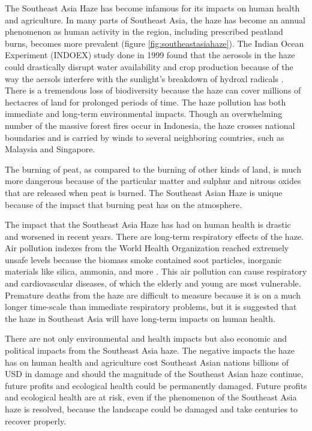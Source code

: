 The Southeast Asia Haze has become infamous for its impacts on human health and agriculture. In many parts of Southeast Asia, the haze has become an annual phenomenon as human activity in the region, including prescribed peatland burns, becomes more prevalent (figure \ref{fig:southeastasiahaze}). The Indian Ocean Experiment (INDOEX) study done in 1999 found that the aerosols in the haze could drastically disrupt water availability and crop production because of the way the aersols interfere with the sunlight's breakdown of hydroxl radicals \citep{taylor2003abcs}. There is a tremendous loss of biodiversity because the haze can cover millions of hectacres of land for prolonged periods of time. The haze pollution has both immediate and long-term environmental impacts. Though an overwhelming number of the massive forest fires occur in Indonesia, the haze crosses national boundaries and is carried by winds to several neighboring countries, such as Malaysia and Singapore.    

The burning of peat, as compared to the burning of other kinds of land, is much more dangerous because of the particular matter and sulphur and nitrous oxides that are released when peat is burned. The Southeast Asian Haze is unique because of the impact that burning peat has on the atmosphere. 

The impact that the Southeast Asia Haze has had on human health is drastic and worsened in recent years. There are long-term respiratory effects of the haze. Air pollution indexes from the World Health Organization reached extremely unsafe levels because the biomass smoke contained soot particles, inorganic materials like silica, ammonia, and more \citep{sastry2002forest}. This air pollution can cause respiratory and cardiovascular diseases, of which the elderly and young are most vulnerable. Premature deaths from the haze are difficult to measure because it is on a much longer time-scale than immediate respiratory problems, but it is suggested that the haze in Southeast Asia will have long-term impacts on human health.

There are not only environmental and health impacts but also economic and political impacts from the Southeast Asia haze. The negative impacts the haze has on human health and agriculture cost Southeast Asian nations billions of USD in damage and should the magnitude of the Southeast Asian haze continue, future profits and ecological health could be permanently damaged. Future profits and ecological health are at risk, even if the phenomenon of the Southeast Asia haze is resolved, because the landscape could be damaged and take centuries to recover properly.


